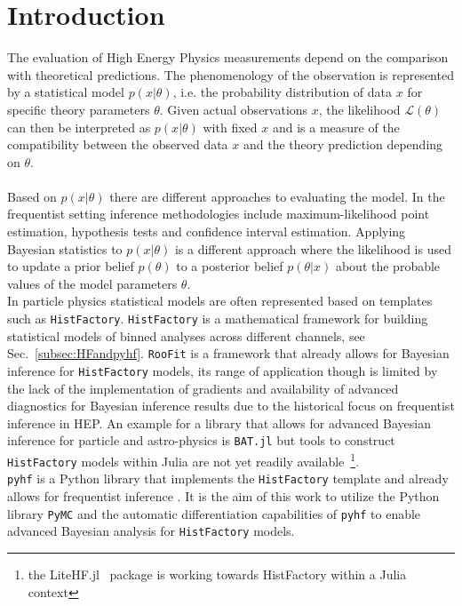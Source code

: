 \section{Introduction}\label{sec:introduction}

The evaluation of High Energy Physics measurements depend on the comparison with theoretical predictions. The phenomenology of the observation is represented by a statistical model $p(x | \theta)$, i.e. the probability distribution of data $x$ for specific theory parameters $\theta$.
Given actual observations $x$, the likelihood $\mathcal{L}(\theta)$ can then be interpreted as $p(x | \theta)$ with fixed $x$ and is a measure of the compatibility between the observed data $x$ and the theory prediction depending on $\theta$.   \\ \\
Based on $p(x | \theta)$ there are different approaches to evaluating the model. In the frequentist setting inference methodologies include maximum-likelihood point estimation, hypothesis tests and confidence interval estimation. Applying Bayesian statistics to $p(x | \theta)$ is a different approach where the likelihood is used to update a prior belief $p(\theta)$ to a posterior belief $p(\theta|x)$ about the probable values of the model parameters $\theta$. \\
In particle physics statistical models are often represented based on templates such as \texttt{HistFactory}. \texttt{HistFactory} is a mathematical framework for building statistical models of binned analyses across different channels, see Sec.~\ref{subsec:HFandpyhf}. \texttt{RooFit} \cite{root} is a framework that already allows for Bayesian inference for \texttt{HistFactory} models, its range of application though is limited by the lack of the implementation of gradients and availability of advanced diagnostics for Bayesian inference results due to the historical focus on frequentist inference in HEP. An example for a library that allows for advanced Bayesian inference for particle and astro-physics is \texttt{BAT.jl} \cite{Schulz:2021BAT} but tools to construct \texttt{HistFactory} models within Julia are not yet readily available~\footnote{the LiteHF.jl~\cite{LiteHF} package is working towards HistFactory within a Julia context }. \\
\texttt{pyhf} is a Python library that implements the \texttt{HistFactory} template and already allows for frequentist inference \cite{pyhf, pyhf_joss}. It is the aim of this work to utilize the Python library \texttt{PyMC} and the automatic differentiation capabilities of \texttt{pyhf} to enable advanced Bayesian analysis for \texttt{HistFactory} models.
